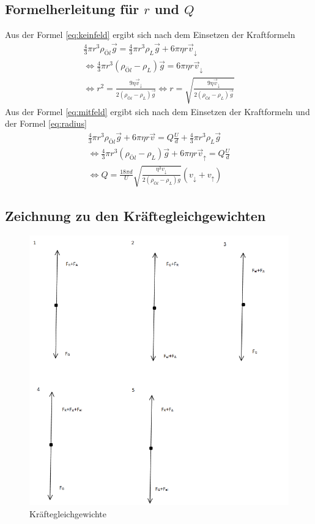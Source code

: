 \subsection{Formelherleitung für $r$ und $Q$}
Aus der Formel \ref{eq:keinfeld} ergibt sich nach dem Einsetzen der Kraftformeln
\begin{gather*}
\frac{4}{3}\pi r^3 \rho_{Öl}\vec{g}=\frac{4}{3}\pi r^3 \rho_{L}\vec{g}+6\pi \eta  r \vec{v}_{\downarrow}\\
\iff \frac{4}{3}\pi r^3 (\rho_{Öl}-\rho_{L})\vec{g}=6\pi \eta  r \vec{v}_{\downarrow}\\
\iff r^2=\frac{9\eta \vec{v}_{\downarrow}}{2(\rho_{Öl}-\rho_{L})\vec{g}}
\iff r=\sqrt{\frac{9\eta \vec{v}_{\downarrow}}{2(\rho_{Öl}-\rho_{L})\vec{g}}}
\end{gather*}
Aus der Formel \ref{eq:mitfeld} ergibt sich nach dem Einsetzen der Kraftformeln und der Formel \ref{eq:radius}
\begin{gather*}
\frac{4}{3}\pi r^3 \rho_{Öl}\vec{g}+6\pi \eta  r \vec{v}=Q\frac{U}{d}+\frac{4}{3}\pi r^3 \rho_{L}\vec{g}\\
\iff \frac{4}{3}\pi r^3 (\rho_{Öl}-\rho_{L})\vec{g}+6\pi \eta  r \vec{v}_{\uparrow}=Q\frac{U}{d}\\
\iff Q = \frac{18 \pi d}{U}\sqrt{\frac{\eta^3 v_{\downarrow}}{2(\rho_{Öl}-\rho_L)g}}(v_{\downarrow}+v_{\uparrow})
\end{gather*}
\subsection{Zeichnung zu den Kräftegleichgewichten}
\begin{figure}[h]
  \centering
  \includegraphics[width=1\textwidth]{kraftegleichgewichte.png}
  \caption{Kräftegleichgewichte}
  \label{fig:kraftegleich}
\end{figure}
